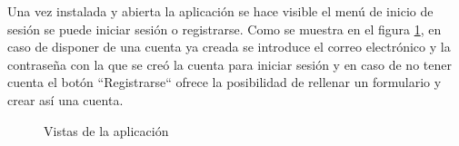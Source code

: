\setcounter{chapter}{2}
\setcounter{section}{0}
\setcounter{figure}{0}

\noindent
Una vez instalada y abierta la aplicación se hace visible el menú de inicio de sesión se puede iniciar sesión o registrarse. Como se muestra en el figura \ref{fig:vista_registrarse}, en caso de disponer de una cuenta ya creada se introduce el correo electrónico y la contraseña con la que se creó la cuenta para iniciar sesión y en caso de no tener cuenta el botón ``Registrarse`` ofrece la posibilidad de rellenar un formulario y crear así una cuenta.

\begin{figure}[H]
    \centering
    \caption{Vistas de la aplicación}
    \label{fig:vista_registrarse}
\end{figure}

